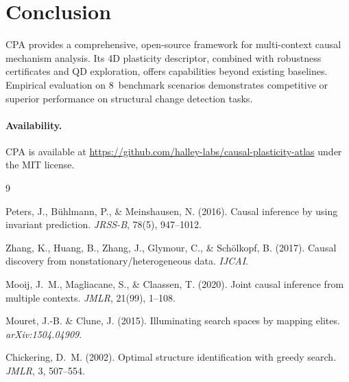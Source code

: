\documentclass[11pt]{article}
\newcommand{\cpa}{\textsc{CPA}}
\begin{document}
\section{Conclusion}

\cpa{} provides a comprehensive, open-source framework for multi-context
causal mechanism analysis. Its 4D plasticity descriptor, combined with
robustness certificates and QD exploration, offers capabilities beyond
existing baselines. Empirical evaluation on 8~benchmark scenarios
demonstrates competitive or superior performance on structural change
detection tasks.

\paragraph{Availability.}
\cpa{} is available at
\url{https://github.com/halley-labs/causal-plasticity-atlas}
under the MIT license.

\begin{thebibliography}{9}

Peters, J., B\"uhlmann, P., \& Meinshausen, N. (2016).
Causal inference by using invariant prediction.
\emph{JRSS-B}, 78(5), 947--1012.

Zhang, K., Huang, B., Zhang, J., Glymour, C., \& Sch\"olkopf, B. (2017).
Causal discovery from nonstationary/heterogeneous data.
\emph{IJCAI}.

Mooij, J.~M., Magliacane, S., \& Claassen, T. (2020).
Joint causal inference from multiple contexts.
\emph{JMLR}, 21(99), 1--108.

Mouret, J.-B. \& Clune, J. (2015).
Illuminating search spaces by mapping elites.
\emph{arXiv:1504.04909}.

Chickering, D.~M. (2002).
Optimal structure identification with greedy search.
\emph{JMLR}, 3, 507--554.

\end{thebibliography}
\end{document}
